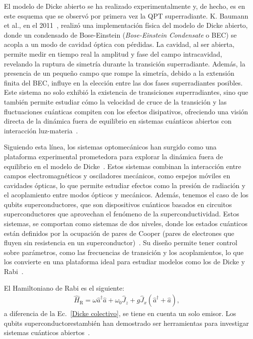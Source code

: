 \documentclass[onecolumn,notitlepage,letterpaper,aps,pra,12pt]{article}
\numberwithin{equation}{section}
\begin{document}
El modelo de Dicke abierto se ha realizado experimentalmente y, de hecho, es en este esquema que se observó por primera vez la QPT superradiante. K. Baumann et al., en el 2011~\cite{Baumann11}, realizó una implementación física del modelo de Dicke abierto, donde un condensado de Bose-Einstein (\textit{Bose-Einstein Condensate} o BEC) se acopla a un modo de cavidad óptica con pérdidas. La cavidad, al ser abierta, permite medir en tiempo real la amplitud y fase del campo intracavidad, revelando la ruptura de simetría durante la transición superradiante. Además, la presencia de un pequeño campo que rompe la simetría, debido a la extensión finita del BEC, influye en la elección entre las dos fases superradiantes posibles. Este sistema no solo exhibió la existencia de transiciones superradiantes, sino que también permite estudiar cómo la velocidad de cruce de la transición y las fluctuaciones cuánticas compiten con los efectos disipativos, ofreciendo una visión directa de la dinámica fuera de equilibrio en sistemas cuánticos abiertos con interacción luz-materia~\cite{Baumann10}.

Siguiendo esta línea, los sistemas optomecánicos han surgido como una plataforma experimental prometedora para explorar la dinámica fuera de equilibrio en el modelo de Dicke~\cite{debnath2015}. Estos sistemas combinan la interacción entre campos electromagnéticos y osciladores mecánicos, como espejos móviles en cavidades ópticas, lo que permite estudiar efectos como la presión de radiación y el acoplamiento entre modos ópticos y mecánicos. Además, tenemos el caso de los qubits superconductores, que son dispositivos cuánticos basados en circuitos superconductores que aprovechan el fenómeno de la superconductividad. Estos sistemas, se comportan como sistemas de dos niveles, donde los estados cuánticos están definidos por la ocupación de pares de Cooper (pares de electrones que fluyen sin resistencia en un superconductor)~\cite{Lamata2017}. Su diseño permite tener control sobre parámetros, como las frecuencias de transición y los acoplamientos, lo que los convierte en una plataforma ideal para estudiar modelos como los de Dicke y Rabi~\cite{Mezzacapo14}. 

El Hamiltoniano de Rabi es el siguiente:
\begin{gather}
    \hat{H}_{\text{R}} = \omega\hat{a}^{\dagger}\hat{a} + \omega_{0}\hat{J}_{z} + g\hat{J}_{x}\left(\hat{a}^{\dagger} + \hat{a}\right),
\end{gather}
a diferencia de la Ec.~\ref{Dicke colectivo}, se tiene en cuenta un solo emisor. Los qubits superconductorestambién han demostrado ser herramientas para investigar sistemas cuánticos abiertos~\cite{hwang2018,Lo2021}.
\end{document}
